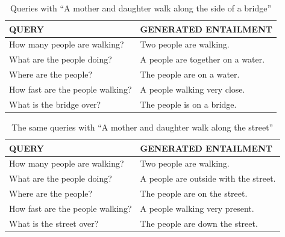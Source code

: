 \documentclass[utf8]{frontiersSCNS} %
\begin{document}
\begin{table}[!t]
\begin{center} 
\caption{Queries with ``A mother and daughter walk along the side of a bridge''} 
\label{query} 

\vskip 0.07in
\setlength{\tabcolsep}{8pt}
\begin{tabular}{ll} 

\hline

\rule{0pt}{3ex} QUERY &  GENERATED ENTAILMENT \\

\hline
\rule{0pt}{3ex}How many people are walking? & Two people are walking.\\
 What are the people doing? & A people are together on a water. \\
 Where are the people? & The people are on a water. \\
 How fast are the people walking? & A people walking very close.\\
 What is the bridge over? & The people is on a bridge. \\

\end{tabular}
\end{center} 
\end{table}


\begin{table}[!t]
\begin{center} 
\caption{The same queries with ``A mother and daughter walk along the street''} 
\label{query_2} 

\vskip 0.07in
\setlength{\tabcolsep}{8pt}
\begin{tabular}{ll} 

\hline

\rule{0pt}{3ex} QUERY &  GENERATED ENTAILMENT \\

\hline
\rule{0pt}{3ex}How many people are walking? & Two people are walking.\\
 What are the people doing? & A people are outside with the street.  \\
 Where are the people? & The people are on the street. \\
 How fast are the people walking? & A people walking very present. \\
 What is the street over? & The people are down the street. \\

\end{tabular}
\end{center} 
\end{table}
\end{document}
